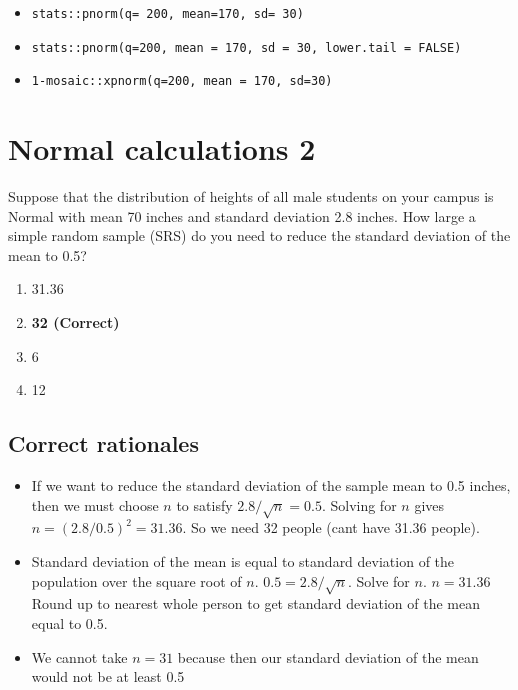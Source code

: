 \documentclass[letterpaper,9pt,twoside,printwatermark=false]{pinp}
\providecommand{\tightlist}{%
  \setlength{\itemsep}{0pt}\setlength{\parskip}{0pt}}
\begin{document}
\begin{itemize}
\tightlist
\item
  \texttt{stats::pnorm(q=\ 200,\ mean=170,\ sd=\ 30)}
\item
  \texttt{stats::pnorm(q=200,\ mean\ =\ 170,\ sd\ =\ 30,\ lower.tail\ =\ FALSE)}
\item
  \texttt{1-mosaic::xpnorm(q=200,\ mean\ =\ 170,\ sd=30)}
\end{itemize}

\section{Normal calculations 2}\label{normal-calculations-2}

Suppose that the distribution of heights of all male students on your
campus is Normal with mean 70 inches and standard deviation 2.8 inches.
How large a simple random sample (SRS) do you need to reduce the
standard deviation of the mean to 0.5?

\begin{enumerate}
\def\labelenumi{\alph{enumi}.}
\tightlist
\item
  31.36
\item
  \textbf{32 (Correct)}
\item
  6
\item
  12
\end{enumerate}

\subsection{Correct rationales}\label{correct-rationales-1}

\begin{itemize}
\tightlist
\item
  If we want to reduce the standard deviation of the sample mean to 0.5
  inches, then we must choose \(n\) to satisfy \(2.8/ \sqrt{n} = 0.5\).
  Solving for \(n\) gives \(n = (2.8/0.5)^2 = 31.36\). So we need 32
  people (cant have 31.36 people).
\item
  Standard deviation of the mean is equal to standard deviation of the
  population over the square root of \(n\). \(0.5 = 2.8 / \sqrt{n}\).
  Solve for \(n\). \(n = 31.36\) Round up to nearest whole person to get
  standard deviation of the mean equal to 0.5.
\item
  We cannot take \(n=31\) because then our standard deviation of the
  mean would not be at least 0.5
\end{itemize}
\end{document}
